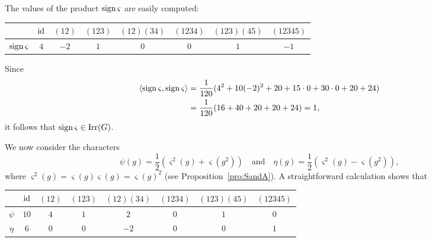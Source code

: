 The values of the product 
$\operatorname{sign}\varsigma$ are easily computed: 
\bigskip 
\begin{center}
    \begin{tabular}{|c|ccccccc|}
        \hline 
        & $\operatorname{id}$ & $(12)$ & $(123)$ & $(12)(34)$ & $(1234)$ & $(123)(45)$  & $(12345)$ \\
        \hline 
        $\operatorname{sign}\varsigma$ & $4$ & $-2$ & $1$ & $0$ & $0$ & $1$ & $-1$ \\
        \hline 
    \end{tabular}
\end{center}
\bigskip 

Since 
\begin{align*}
\langle\operatorname{sign}\varsigma,\operatorname{sign}\varsigma\rangle&=
\frac{1}{120}(4^2+10(-2)^2+20+15\cdot 0+30\cdot 0+20+24)\\
&=\frac{1}{120}(16+40+20+20+24)=1,
\end{align*}
it follows that $\operatorname{sign}\varsigma\in\operatorname{Irr}(G)$. 

We now consider the characters 
\[
\psi(g)=\frac12(\varsigma^2(g)+\varsigma(g^2))\quad\text{and}\quad  
\eta(g)=\frac12(\varsigma^2(g)-\varsigma(g^2)),
\]
where $\varsigma^2(g)=\varsigma(g)\varsigma(g)=\varsigma(g)^2$ (see Proposition~\ref{pro:SandA}). 
A straightforward 
calculation shows that 
\bigskip 
\begin{center}
    \begin{tabular}{|c|ccccccc|}
        \hline 
        & $\operatorname{id}$ & $(12)$ & $(123)$ & $(12)(34)$ & $(1234)$ & $(123)(45)$  & $(12345)$ \\
        \hline 
        $\psi$ & $10$ & $4$ & $1$ & $2$ & $0$ & $1$ & $0$ \\
        $\eta$ & $6$ & $0$ & $0$ & $-2$ & $0$ & $0$ & $1$ \\
        \hline 
    \end{tabular}
\end{center}
\bigskip 


